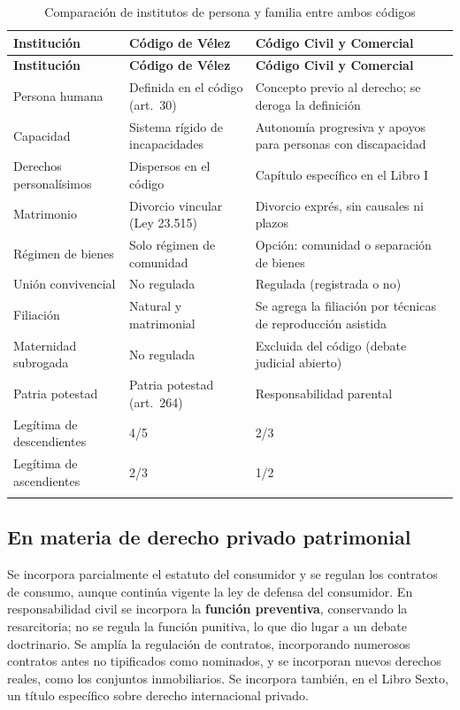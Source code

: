 \documentclass[12pt,oneside]{book}
\begin{document}
\begin{longtable}{@{}B{0.20\textwidth}L{0.34\textwidth}L{0.34\textwidth}@{}}
\toprule
\textbf{Institución} & \textbf{Código de Vélez} & \textbf{Código Civil y Comercial} \\
\midrule
\endfirsthead
\toprule
\textbf{Institución} & \textbf{Código de Vélez} & \textbf{Código Civil y Comercial} \\
\midrule
\endhead
\bottomrule
\endfoot
Persona humana & Definida en el código (art.~30) & Concepto previo al derecho; se deroga la definición \\
Capacidad & Sistema rígido de incapacidades & Autonomía progresiva y apoyos para personas con discapacidad \\
Derechos personalísimos & Dispersos en el código & Capítulo específico en el Libro I \\
Matrimonio & Divorcio vincular (Ley 23.515) & Divorcio exprés, sin causales ni plazos \\
Régimen de bienes & Solo régimen de comunidad & Opción: comunidad o separación de bienes \\
Unión convivencial & No regulada & Regulada (registrada o no) \\
Filiación & Natural y matrimonial & Se agrega la filiación por técnicas de reproducción asistida \\
Maternidad subrogada & No regulada & Excluida del código (debate judicial abierto) \\
Patria potestad & Patria potestad (art.~264) & Responsabilidad parental \\
Legítima de descendientes & 4/5 & 2/3 \\
Legítima de ascendientes & 2/3 & 1/2 \\
\caption{Comparación de institutos de persona y familia entre ambos códigos}\\
\end{longtable}

\subsection{En materia de derecho privado patrimonial}

Se incorpora parcialmente el estatuto del consumidor y se regulan los contratos de consumo, aunque continúa vigente la ley de defensa del consumidor. En responsabilidad civil se incorpora la \textbf{función preventiva}, conservando la resarcitoria; no se regula la función punitiva, lo que dio lugar a un debate doctrinario. Se amplía la regulación de contratos, incorporando numerosos contratos antes no tipificados como nominados, y se incorporan nuevos derechos reales, como los conjuntos inmobiliarios. Se incorpora también, en el Libro Sexto, un título específico sobre derecho internacional privado.
\end{document}
